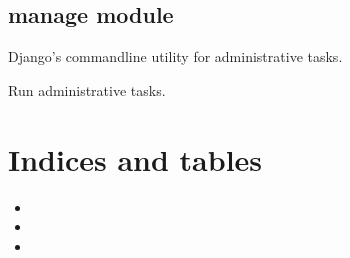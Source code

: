 \documentclass[letterpaper,11pt,polish]{sphinxmanual}
\begin{document}
\section{manage module}
\label{\detokenize{manage:module-manage}}\label{\detokenize{manage:manage-module}}\label{\detokenize{manage::doc}}
\sphinxAtStartPar
Django’s command\sphinxhyphen{}line utility for administrative tasks.

\begin{fulllineitems}
\label{\detokenize{manage:manage.main}}
\pysigstartsignatures
{}
\pysigstopsignatures
\sphinxAtStartPar
Run administrative tasks.

\end{fulllineitems}



\chapter{Indices and tables}
\label{\detokenize{index:indices-and-tables}}\begin{itemize}
\item {} 
\sphinxAtStartPar
{}

\item {} 
\sphinxAtStartPar
{}

\item {} 
\sphinxAtStartPar
{}

\end{itemize}
\end{document}
